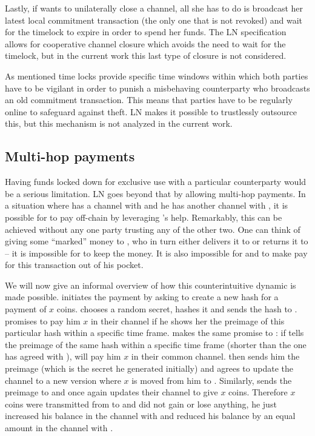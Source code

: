     Lastly, if \alice{} wants to unilaterally close a channel, all she has to do
    is broadcast her latest local commitment transaction (the only one that is
    not revoked) and wait for the timelock to expire in order to spend her
    funds. The LN specification allows for cooperative channel closure which
    avoids the need to wait for the timelock, but in the current work
    this last type of closure is not considered.

    As mentioned time locks provide specific time windows within which 
    both parties have to be
    vigilant in order to punish a misbehaving  counterparty who  broadcasts an old
    commitment transaction. This means that 
    parties have to be regularly online to
    safeguard against theft. LN makes it possible to trustlessly outsource this,
    but this mechanism is not analyzed in the current work.

  \subsection{Multi-hop payments}
  
    Having funds locked down for exclusive use with a particular counterparty
    would be a serious limitation. LN goes beyond that by 
    allowing multi-hop payments. In
    a situation where \alice{} has a channel with \bob{} and he has another
    channel with \charlie{}, it is possible for \alice{} to pay \charlie{}
    off-chain by leveraging \bob's help. Remarkably, this can be achieved
    without any one party trusting any of the other two. One can think of
    \alice{} giving some ``marked'' money to \bob{}, who in turn either delivers
    it to \charlie{} or returns it to \alice{} -- it is impossible for \bob{} to
    keep the money. It is also impossible for \alice{} and \charlie{} to make
    \bob{} pay for this transaction out of his pocket.

    We will now give an informal overview of how this counterintuitive dynamic
    is made possible. \alice{} initiates the payment by asking \charlie{} to
    create a new hash for a payment of $x$ coins. \charlie{} chooses a random
    secret, hashes it and sends the hash to \alice. \alice{} promises \bob{} to
    pay him $x$ in their channel if he shows her the preimage of this particular
    hash within a specific time frame. \bob{} makes the same promise to
    \charlie{}: if \charlie{} tells \bob{} the preimage of the same hash within
    a specific time frame (shorter than the one \bob{} has agreed with
    \alice{}), \bob{} will pay him $x$ in their common channel. \charlie{} then
    sends him the preimage (which is the secret he generated initially) and
    \bob{} agrees to update the channel to a new version where $x$ is moved from
    him to \charlie. Similarly, \bob{} sends the preimage to \alice{} and once
    again \alice{} updates their channel to give \bob{} $x$ coins. Therefore $x$
    coins were transmitted from \alice{} to \charlie{} and \bob{} did not gain
    or lose anything, he just increased his balance in the channel with \alice{}
    and reduced his balance by an equal amount in the channel with \charlie.

